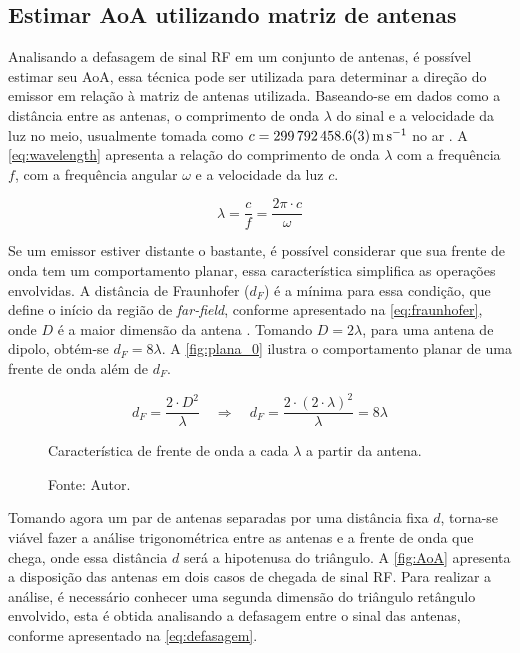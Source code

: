 \subsection{Estimar \acs{AoA} utilizando matriz de antenas}

Analisando a defasagem de sinal \ac{RF} em um conjunto de antenas, é possível estimar seu \acf{AoA}, essa técnica pode ser utilizada para determinar a direção do emissor em relação à matriz de antenas utilizada.
Baseando-se em dados como a distância entre as antenas, o comprimento de onda $\lambda$ do sinal e a velocidade da luz no meio, usualmente tomada como $c = \SI{299792458,6 \pm 0,3}{\metre\per\second}$ no ar \cite{jennings1987continuity, bensky2016wireless, horst2021localization}.
A \autoref{eq:wavelength} apresenta a relação do comprimento de onda $\lambda$ com a frequência $f$, com a frequência angular $\omega$ e a velocidade da luz $c$.

\begin{equation}\label{eq:wavelength}
    \lambda = \frac{c}{f} = \frac{2\pi \cdot c}{\omega}
\end{equation}

Se um emissor estiver distante o bastante, é possível considerar que sua frente de onda tem um comportamento planar, essa característica simplifica as operações envolvidas.
A distância de Fraunhofer ($d_F$) é a mínima para essa condição, que define o início da região de \textit{far-field}, conforme apresentado na \autoref{eq:fraunhofer}, onde $D$ é a maior dimensão da antena \cite{balanis2016antenna}.
Tomando $D = 2  \lambda$, para uma antena de dipolo, obtém-se $d_F = 8 \lambda$.
A \autoref{fig:plana_0} ilustra o comportamento planar de uma frente de onda além de $d_F$.

\begin{equation}\label{eq:fraunhofer}
    d_F = \frac{2 \cdot D^2}{\lambda} \quad \Rightarrow \quad d_F = \frac{2 \cdot \left(2 \cdot \lambda \right)^2}{\lambda} = 8 \lambda
\end{equation}

\begin{figure}[htpb]
    \centering
    \caption{Característica de frente de onda a cada $\lambda$ a partir da antena.}
    
    \caption*{Fonte: Autor.}
    \label{fig:plana_0}
\end{figure}

Tomando agora um par de antenas separadas por uma distância fixa $d$, torna-se viável fazer a análise trigonométrica entre as antenas e a frente de onda que chega, onde essa distância $d$ será a hipotenusa do triângulo.
A \autoref{fig:AoA} apresenta a disposição das antenas em dois casos de chegada de sinal \ac{RF}.
Para realizar a análise, é necessário conhecer uma segunda dimensão do triângulo retângulo envolvido, esta é obtida analisando a defasagem entre o sinal das antenas, conforme apresentado na \autoref{eq:defasagem}.

